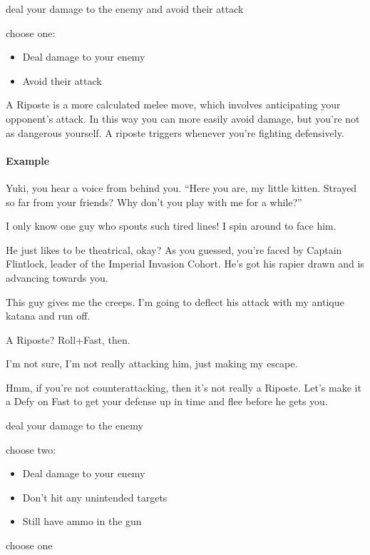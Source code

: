 {deal your damage to the enemy and avoid their attack}
{choose one:
\begin{itemize}
\item Deal damage to your enemy
\item Avoid their attack
\end{itemize}}

A Riposte is a more calculated melee move, which involves anticipating
your opponent's attack. In this way you can more easily avoid damage,
but you're not as dangerous yourself. A riposte triggers whenever
you're fighting defensively.

\paragraph{Example}
\begin{dialogue}
   Yuki, you hear a voice from behind you. ``Here you are,
  my little kitten. Strayed so far from your friends? Why don't you
  play with me for a while?''
  
   I only know one guy who spouts such tired lines! I spin
  around to face him.

   He just likes to be theatrical, okay? As you guessed,
  you're faced by Captain Flintlock, leader of the Imperial Invasion
  Cohort. He's got his rapier drawn and is advancing towards you.

   This guy gives me the creeps. I'm going to deflect his
  attack with my antique katana and run off.

   A Riposte? Roll+Fast, then.

   I'm not sure, I'm not really attacking him, just making
  my escape.

   Hmm, if you're not counterattacking, then it's not really
  a Riposte. Let's make it a Defy on Fast to get your defense up in
  time and flee before he gets you.
\end{dialogue}

{deal your damage to the enemy}
{choose two:
\begin{itemize}
\item Deal damage to your enemy
\item Don't hit any unintended targets
\item Still have ammo in the gun
\end{itemize}}
{choose one}

